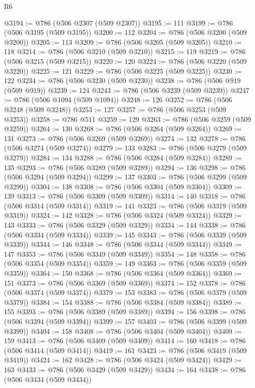 \begin{lexlean}{R6}
\begin{coremodule}
@3194 := @786 (@506 @2307 (@509 @2307))
@3195 := 111
@3199 := @786 (@506 @3195 (@509 @3195))
@3200 := 112
@3204 := @786 (@506 @3200 (@509 @3200))
@3205 := 113
@3209 := @786 (@506 @3205 (@509 @3205))
@3210 := 118
@3214 := @786 (@506 @3210 (@509 @3210))
@3215 := 119
@3219 := @786 (@506 @3215 (@509 @3215))
@3220 := 120
@3224 := @786 (@506 @3220 (@509 @3220))
@3225 := 121
@3229 := @786 (@506 @3225 (@509 @3225))
@3230 := 122
@3234 := @786 (@506 @3230 (@509 @3230))
@3238 := @786 (@506 @919 (@509 @919))
@3239 := 124
@3243 := @786 (@506 @3239 (@509 @3239))
@3247 := @786 (@506 @1094 (@509 @1094))
@3248 := 126
@3252 := @786 (@506 @3248 (@509 @3248))
@3253 := 127
@3257 := @786 (@506 @3253 (@509 @3253))
@3258 := @786 @511
@3259 := 129
@3263 := @786 (@506 @3259 (@509 @3259))
@3264 := 130
@3268 := @786 (@506 @3264 (@509 @3264))
@3269 := 131
@3273 := @786 (@506 @3269 (@509 @3269))
@3274 := 132
@3278 := @786 (@506 @3274 (@509 @3274))
@3279 := 133
@3283 := @786 (@506 @3279 (@509 @3279))
@3284 := 134
@3288 := @786 (@506 @3284 (@509 @3284))
@3289 := 135
@3293 := @786 (@506 @3289 (@509 @3289))
@3294 := 136
@3298 := @786 (@506 @3294 (@509 @3294))
@3299 := 137
@3303 := @786 (@506 @3299 (@509 @3299))
@3304 := 138
@3308 := @786 (@506 @3304 (@509 @3304))
@3309 := 139
@3313 := @786 (@506 @3309 (@509 @3309))
@3314 := 140
@3318 := @786 (@506 @3314 (@509 @3314))
@3319 := 141
@3323 := @786 (@506 @3319 (@509 @3319))
@3324 := 142
@3328 := @786 (@506 @3324 (@509 @3324))
@3329 := 143
@3333 := @786 (@506 @3329 (@509 @3329))
@3334 := 144
@3338 := @786 (@506 @3334 (@509 @3334))
@3339 := 145
@3343 := @786 (@506 @3339 (@509 @3339))
@3344 := 146
@3348 := @786 (@506 @3344 (@509 @3344))
@3349 := 147
@3353 := @786 (@506 @3349 (@509 @3349))
@3354 := 148
@3358 := @786 (@506 @3354 (@509 @3354))
@3359 := 149
@3363 := @786 (@506 @3359 (@509 @3359))
@3364 := 150
@3368 := @786 (@506 @3364 (@509 @3364))
@3369 := 151
@3373 := @786 (@506 @3369 (@509 @3369))
@3374 := 152
@3378 := @786 (@506 @3374 (@509 @3374))
@3379 := 153
@3383 := @786 (@506 @3379 (@509 @3379))
@3384 := 154
@3388 := @786 (@506 @3384 (@509 @3384))
@3389 := 155
@3393 := @786 (@506 @3389 (@509 @3389))
@3394 := 156
@3398 := @786 (@506 @3394 (@509 @3394))
@3399 := 157
@3403 := @786 (@506 @3399 (@509 @3399))
@3404 := 158
@3408 := @786 (@506 @3404 (@509 @3404))
@3409 := 159
@3413 := @786 (@506 @3409 (@509 @3409))
@3414 := 160
@3418 := @786 (@506 @3414 (@509 @3414))
@3419 := 161
@3423 := @786 (@506 @3419 (@509 @3419))
@3424 := 162
@3428 := @786 (@506 @3424 (@509 @3424))
@3429 := 163
@3433 := @786 (@506 @3429 (@509 @3429))
@3434 := 164
@3438 := @786 (@506 @3434 (@509 @3434))

\end{coremodule}
\end{lexlean}
